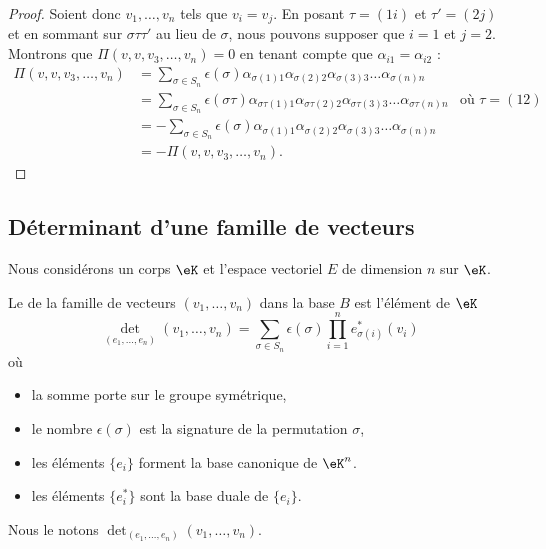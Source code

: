 \begin{proof}
	Soient donc \( v_1,\ldots, v_n\) tels que \( v_i=v_j\). En posant \( \tau=(1i)\) et \( \tau'=(2j)\) et en sommant sur \( \sigma\tau\tau'\) au lieu de \( \sigma\), nous pouvons supposer que \( i=1\) et \( j=2\). Montrons que \( \Pi(v,v,v_3,\ldots, v_n)=0\) en tenant compte que \( \alpha_{i1}=\alpha_{i2}\) :
	\begin{subequations}
		\begin{align}
			\Pi(v,v,v_3,\ldots, v_n) & =\sum_{\sigma\in S_n}\epsilon(\sigma)\alpha_{\sigma(1)1}\alpha_{\sigma(2)2}\alpha_{\sigma(3)3}\ldots \alpha_{\sigma(n)n}                                            \\
			                         & =\sum_{\sigma\in S_n}\epsilon(\sigma\tau)\alpha_{\sigma\tau(1)1}\alpha_{\sigma\tau(2)2}\alpha_{\sigma\tau(3)3}\ldots \alpha_{\sigma\tau(n)n} & \text{où } \tau=(12) \\
			                         & =-\sum_{\sigma\in S_n}\epsilon(\sigma)\alpha_{\sigma(1)1}\alpha_{\sigma(2)2}\alpha_{\sigma(3)3}\ldots \alpha_{\sigma(n)n}                                           \\
			                         & =-\Pi(v,v,v_3,\ldots, v_n).
		\end{align}
	\end{subequations}
\end{proof}

\subsection{Déterminant d'une famille de vecteurs}

Nous considérons un corps \( \eK\) et l'espace vectoriel \( E\) de dimension \( n\) sur \( \eK\).

\begin{definition}\label{DEFooODDFooSNahPb}
	Le  de la famille de vecteurs \( (v_1,\ldots, v_n)\) dans la base \( B\) est l'élément de \( \eK\)
	\begin{equation}        \label{EQooOJEXooXUpwfZ}
		\det_{(e_1,\ldots, e_n)}(v_1,\ldots, v_n)=\sum_{\sigma\in S_n}\epsilon(\sigma)\prod_{i=1}^ne^*_{\sigma(i)}(v_i)
	\end{equation}
	où
	\begin{itemize}
		\item
		      la somme porte sur le groupe symétrique,
		\item
		      le nombre \( \epsilon(\sigma)\) est la signature de la permutation \( \sigma\),
		\item
		      les éléments \( \{ e_i \}\) forment la base canonique de \( \eK^n\).
		\item
		      les éléments \( \{ e^*_i \}\) sont la base duale de \( \{ e_i \}\).
	\end{itemize}
	Nous le notons \( \det_{(e_1,\ldots, e_n)}(v_1,\ldots, v_n)\).
\end{definition}

